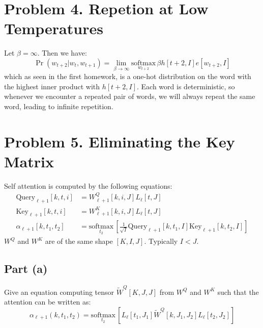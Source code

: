 \documentclass{amsart}
\theoremstyle{definition}
\begin{document}
\section*{Problem 4. Repetion at Low Temperatures}
Let $\beta = \infty$. Then we have:
\[
\Pr(w_{t + 2} | w_{t}, w_{t + 1}) = \lim_{\beta \to \infty} \underset{w_{t + 2}}{\mathrm{softmax}}\,\beta h[t + 2, I] e[w_{t + 2}, I]
\]
which as seen in the first homework, is a one-hot distribution on the word with the highest inner product with $h[t + 2, I]$.
Each word is deterministic, so whenever we encounter a repeated pair of words, we will always repeat the same word, leading to infinite repetition.

\section*{Problem 5. Eliminating the Key Matrix}
Self attention is computed by the following equations:
\begin{align*}
    \mathrm{Query}_{\ell + 1} [k, t, i] &= W^Q_{\ell + 1}[k, i, J] L_{\ell}[t, J] \\
    \mathrm{Key}_{\ell + 1} [k, t, i] &= W^K_{\ell + 1}[k, i, J] L_{\ell}[t, J] \\
    \alpha_{\ell + 1} [k, t_1, t_2] &= \underset{t_2}{\mathrm{softmax}}\, \left[
        \frac1{\sqrt{I}} \mathrm{Query}_{\ell + 1} [k, t_1, I] \mathrm{Key}_{\ell + 1} [k, t_2, I]
    \right]
\end{align*}
$W^Q$ and $W^K$ are of the same shape $[K, I, J]$. Typically $I < J$.
\subsection*{Part (a)} Give an equation computing tensor $\tilde{W}^Q[K, J, J]$ from $W^Q$ and $W^K$ such that the attention can be written as:
\[
\alpha_{\ell + 1} (k, t_1, t_2) = \underset{t_2}{\mathrm{softmax}}\, \left[
    L_{\ell} [t_1, J_1] \tilde{W}^Q [k, J_1, J_2] L_{\ell} [t_2, J_2]
\right]
\]
\end{document}
